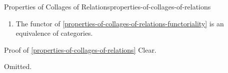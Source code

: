 \begin{proposition}{Properties of Collages of Relations}{properties-of-collages-of-relations}
\begin{enumerate}
\begin{itemize}
\begin{itemize}
\[\begin{cases}
                                    0 &\text{if $x\in A$,}\\
                                    1 &\text{if $x\in B$}
                                \end{cases}
                            \]%
                            for each $x\in\eColl(R)$.
                    \end{itemize}%
                \item{}For each $R,S\in\Obj(\eRel(A,B))$, the action on $\Hom$-sets
                    \[
                        \eColl_{R,S}%
                        \colon%
                        \Hom_{\eRel(A,B)}(R,S)
                        \to
                        \Pos(\eColl(R),\eColl(S))
                    \]%
                    of $\eColl$ at $(R,S)$ is given by sending an inclusion
                    \[
                        \iota%
                        \colon%
                        R%
                        \subset%
                        S%
                    \]%
                    to the morphism
                    \[
                        \eColl(\iota)%
                        \colon%
                        \eColl(R)%
                        \to%
                        \eColl(S)%
                    \]%
                    of posets over $\Delta^{1}$ defined by
                    \[
                        [\eColl(\iota)](x)%
                        \defeq%
                        x%
                    \]%
                    for each $x\in\eColl(R)$.%
                    \footnote{%
                        Note that this is indeed a morphism of posets: if $x\preceq_{\eColl(R)}y$, then $x=y$ or $x\sim_{R}y$, so we have either $x=y$ or $x\sim_{S}y$ (as $R\subset S$), and thus $x\preceq_{\eColl(S)}y$.
                        \par\vspace*{-1.75\baselineskip}
                    }%
            \end{itemize}%
        \item\label{properties-of-collages-of-relations-equivalence}The functor of \cref{properties-of-collages-of-relations-functoriality} is an equivalence of categories.
    \end{enumerate}
\end{proposition}
\begin{Proof}{Proof of \cref{properties-of-collages-of-relations}}%
    Clear.

    Omitted.
\end{Proof}
